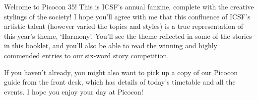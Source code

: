 Welcome to Picocon 35! This is ICSF's annual fanzine, complete with the creative stylings of the society! I hope you'll agree with me that this confluence of ICSF's artistic talent (however varied the topics and styles) is a true representation of this year's theme, `Harmony'. You'll see the theme reflected in some of the stories in this booklet, and you'll also be able to read the winning and highly commended entries to our six-word story competition.

If you haven't already, you might also want to pick up a copy of our Picocon guide from the front desk, which has details of today's timetable and all the events. I hope you enjoy your day at Picocon!

